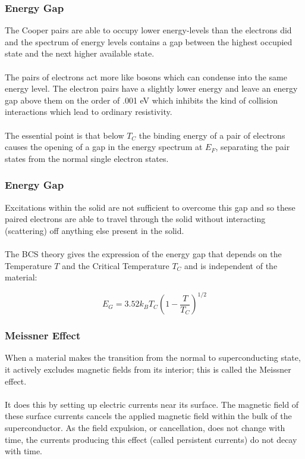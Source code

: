 \documentclass[10pt]{beamer}
\theoremstyle{definition}
\begin{document}
\begin{frame}
    \frametitle{Energy Gap}

    The Cooper pairs are able to occupy lower energy-levels than the 
    electrons did and the spectrum 
    of energy levels contains a gap between the highest occupied 
    state and the next higher available state.
    \\~\\

    The pairs of electrons act more like bosons which can condense into the same 
    energy level. The electron pairs have a slightly lower energy and leave an 
    energy gap above them on the order of .001 eV which inhibits the kind of 
    collision interactions which lead to ordinary resistivity.
    \\~\\

    The essential point is that below $T_C$ the binding energy of a pair of
    electrons causes the opening of a gap in the energy spectrum at $E_F$, 
    separating the pair states from the normal single electron states.


\end{frame}

\begin{frame}
    \frametitle{Energy Gap}

    Excitations within the solid are not sufficient to overcome this gap 
    and so these paired electrons are able to travel through the solid 
    without interacting (scattering) off anything else present in the solid.
    \\~\\

    The BCS theory gives the expression of the energy gap that depends on 
    the Temperature $T$ and the Critical Temperature $T_C$ and is 
    independent of the material:

    \begin{equation}
        E_G = 3.52k_B T_C \left( 1-\frac{T}{T_{C}} \right)^{1/2}
    \end{equation}



\end{frame}


\begin{frame}
    \frametitle{Meissner Effect}

    When a material makes the transition from the normal to superconducting 
    state, it actively excludes magnetic fields from its interior; 
    this is called the Meissner effect.
    \\~\\
    It does this by setting up electric currents near its surface. 
    The magnetic field of these surface currents cancels the applied 
    magnetic field within the bulk of the superconductor. As the field 
    expulsion, or cancellation, does not change with time, the currents 
    producing this effect (called persistent currents) do not decay 
    with time.


\end{frame}
\end{document}
